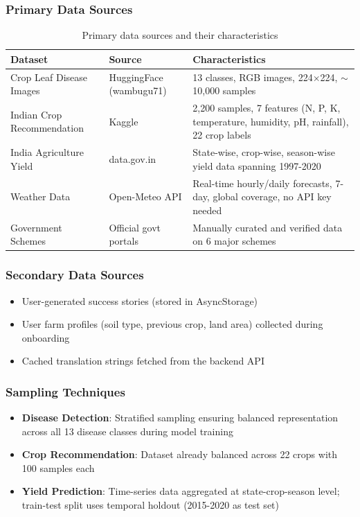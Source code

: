 \documentclass[12pt,a4paper]{article}
\newcommand{\tablefont}{\fontsize{10}{12}\selectfont}
\begin{document}
\subsubsection{Primary Data Sources}
\begin{table}[H]
\centering
\tablefont
\begin{tabular}{|p{3.5cm}|p{3cm}|p{5.5cm}|}
\hline
\textbf{Dataset} & \textbf{Source} & \textbf{Characteristics} \\
\hline
Crop Leaf Disease Images & HuggingFace (wambugu71) & 13 classes, RGB images, 224$\times$224, $\sim$10,000 samples \\
\hline
Indian Crop Recommendation & Kaggle & 2,200 samples, 7 features (N, P, K, temperature, humidity, pH, rainfall), 22 crop labels \\
\hline
India Agriculture Yield & data.gov.in & State-wise, crop-wise, season-wise yield data spanning 1997-2020 \\
\hline
Weather Data & Open-Meteo API & Real-time hourly/daily forecasts, 7-day, global coverage, no API key needed \\
\hline
Government Schemes & Official govt portals & Manually curated and verified data on 6 major schemes \\
\hline
\end{tabular}
\caption{Primary data sources and their characteristics}
\end{table}

\subsubsection{Secondary Data Sources}
\begin{itemize}
    \item User-generated success stories (stored in AsyncStorage)
    \item User farm profiles (soil type, previous crop, land area) collected during onboarding
    \item Cached translation strings fetched from the backend API
\end{itemize}

\subsubsection{Sampling Techniques}
\begin{itemize}
    \item \textbf{Disease Detection}: Stratified sampling ensuring balanced representation across all 13 disease classes during model training
    \item \textbf{Crop Recommendation}: Dataset already balanced across 22 crops with 100 samples each
    \item \textbf{Yield Prediction}: Time-series data aggregated at state-crop-season level; train-test split uses temporal holdout (2015-2020 as test set)
\end{itemize}
\end{document}
